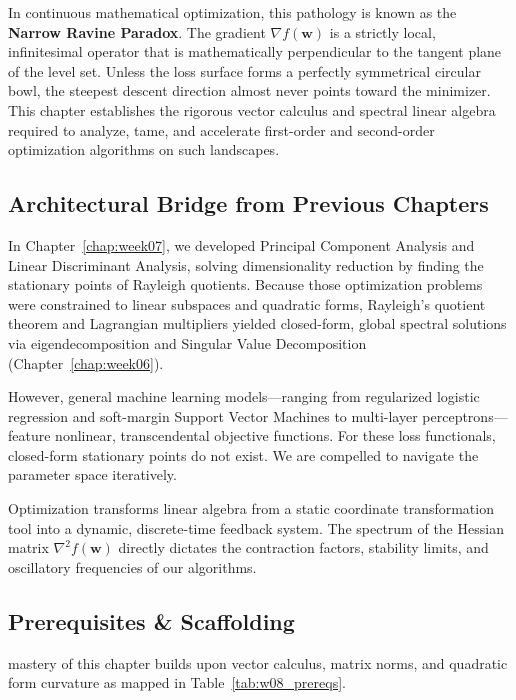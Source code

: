 In continuous mathematical optimization, this pathology is known as the \textbf{Narrow Ravine Paradox}. The gradient $\nabla f(\mathbf{w})$ is a strictly local, infinitesimal operator that is mathematically perpendicular to the tangent plane of the level set. Unless the loss surface forms a perfectly symmetrical circular bowl, the steepest descent direction almost never points toward the minimizer. This chapter establishes the rigorous vector calculus and spectral linear algebra required to analyze, tame, and accelerate first-order and second-order optimization algorithms on such landscapes.

\subsection{Architectural Bridge from Previous Chapters}
In Chapter~\ref{chap:week07}, we developed Principal Component Analysis and Linear Discriminant Analysis, solving dimensionality reduction by finding the stationary points of Rayleigh quotients. Because those optimization problems were constrained to linear subspaces and quadratic forms, Rayleigh's quotient theorem and Lagrangian multipliers yielded closed-form, global spectral solutions via eigendecomposition and Singular Value Decomposition (Chapter~\ref{chap:week06}).

However, general machine learning models---ranging from regularized logistic regression and soft-margin Support Vector Machines to multi-layer perceptrons---feature nonlinear, transcendental objective functions. For these loss functionals, closed-form stationary points do not exist. We are compelled to navigate the parameter space iteratively. 

Optimization transforms linear algebra from a static coordinate transformation tool into a dynamic, discrete-time feedback system. The spectrum of the Hessian matrix $\nabla^2 f(\mathbf{w})$ directly dictates the contraction factors, stability limits, and oscillatory frequencies of our algorithms.

\subsection{Prerequisites \& Scaffolding}
mastery of this chapter builds upon vector calculus, matrix norms, and quadratic form curvature as mapped in Table~\ref{tab:w08_prereqs}.

